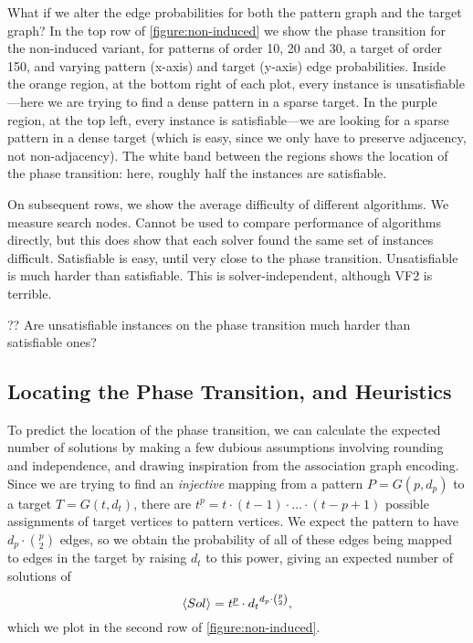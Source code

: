 \documentclass[letterpaper]{article}
\begin{document}
What if we alter the edge probabilities for both the pattern graph and the target graph?  In the top
row of \cref{figure:non-induced} we show the phase transition for the non-induced variant, for
patterns of order 10, 20 and 30, a target of order 150, and varying pattern (x-axis) and target
(y-axis) edge probabilities. Inside the orange region, at the bottom right of each plot, every
instance is unsatisfiable---here we are trying to find a dense pattern in a sparse target. In the
purple region, at the top left, every instance is satisfiable---we are looking for a sparse pattern
in a dense target (which is easy, since we only have to preserve adjacency, not non-adjacency). The
white band between the regions shows the location of the phase transition: here, roughly half the
instances are satisfiable.

On subsequent rows, we show the average difficulty of different algorithms.  We measure search
nodes. Cannot be used to compare performance of algorithms directly, but this does show that each
solver found the same set of instances difficult.  Satisfiable is easy, until very close to the
phase transition. Unsatisfiable is much harder than satisfiable. This is solver-independent,
although VF2 is terrible.

?? Are unsatisfiable instances on the phase transition much harder than satisfiable ones?

\subsection{Locating the Phase Transition, and Heuristics}

To predict the location of the phase transition, we can calculate the expected number of solutions
by making a few dubious assumptions involving rounding and independence, and drawing inspiration
from the association graph encoding. Since we are trying to find an \emph{injective} mapping from a
pattern $P = G(p, d_p)$ to a target $T = G(t, d_t)$, there are $t^{\underline{p}} = t \cdot (t -
1) \cdot \ldots \cdot (t - p + 1)$ possible assignments of target vertices to pattern vertices.  We expect the
pattern to have $d_p \cdot \binom{p}{2}$ edges, so we obtain the probability of all of these edges
being mapped to edges in the target by raising $d_t$ to this power, giving an expected number of
solutions of \[ \langle Sol \rangle = t^{\underline{p}} \cdot {d_t}^{d_p \cdot \binom{p}{2}}
\textnormal{,} \] which we plot in the second row of \cref{figure:non-induced}.
\end{document}
